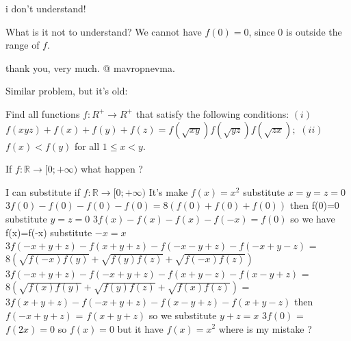 \begin{solution}
	i don't understand!
\end{solution}



\begin{solution}
	What is it not to understand? We cannot have $f(0)=0$, since $0$ is outside the range of $f$.
\end{solution}



\begin{solution}
	thank you, very much.
@ mavropnevma.
\end{solution}



\begin{solution}
	Similar problem, but it's old:

Find all functions $f:R^+ \rightarrow R^+$ that satisfy the following conditions:
$(i)$ $f(xyz)+f(x)+f(y)+f(z)=f(\sqrt{xy})f(\sqrt{yz})f(\sqrt{zx});$
$(ii)$  $f(x)<f(y)$ for all  $1\le x<y.$

\end{solution}



\begin{solution}
	If ${ f:\mathbb{R}\to\mathbb[0;+\infty)} $ what happen ?
\end{solution}



\begin{solution}
	I can substitute if ${ f:\mathbb{R}\to\mathbb[0;+\infty)} $ It's make $f(x)=x^2$ 
substitute $x=y=z=0$
$3f(0)-f(0)-f(0)-f(0)=8(f(0)+f(0)+f(0))$ then f(0)=0 
substitute $y=z=0$
$3f(x)-f(x)-f(x)-f(-x)=f(0)$ so we have f(x)=f(-x)
substitute $-x=x$
$ 3f(-x+y+z)-f(x+y+z)-f(-x-y+z)-f(-x+y-z) $ = $ 8(\sqrt{f(-x)f(y)}+\sqrt{f(y)f(z)}+\sqrt{f(-x)f(z)}) $ 
$ 3f(-x+y+z)-f(-x+y+z)-f(x+y-z)-f(x-y+z) $ = $ 8(\sqrt{f(x)f(y)}+\sqrt{f(y)f(z)}+\sqrt{f(x)f(z)}) $ = $3f(x+y+z)-f(-x+y+z)-f(x-y+z)-f(x+y-z) $
then $ f(-x+y+z)$ = $f(x+y+z)$
so we substitute $y+z=x$
$ 3f(0)$ = $f(2x)=0$
so $f(x)=0$ but it have $f(x)=x^2$
where is my mistake ?
\end{solution}



